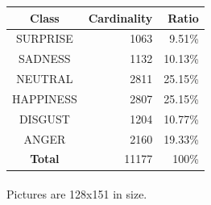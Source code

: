 \vspace{10mm}
\begin{tabular}{|c|r|r|}
	\hline
	Class & Cardinality & Ratio \\
	\hline\hline
	SURPRISE	& 1063 & 9.51\% \\
	\hline
	SADNESS		& 1132 & 10.13\% \\
	\hline
	NEUTRAL		& 2811 & 25.15\%\\
	\hline
	HAPPINESS	& 2807 & 25.15\%\\
	\hline
	DISGUST		& 1204 & 10.77\%\\
	\hline
	ANGER		& 2160 & 19.33\%\\
	\hline\hline
	\textbf{Total} & 11177 & 100\% \\
	\hline
\end{tabular}

\paragraph{}
Pictures are 128x151 in size.

